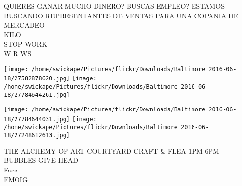 \documentclass[10pt,letterpaper]{article}
\begin{document}
QUIERES GANAR MUCHO DINERO?  BUSCAS EMPLEO?  ESTAMOS BUSCANDO REPRESENTANTES DE VENTAS PARA UNA COPANIA DE MERCADEO\\
KILO\\
STOP WORK\\
W R WS
\pagebreak

\texttt{[image: /home/swickape/Pictures/flickr/Downloads/Baltimore 2016-06-18/27582878620.jpg]}
\texttt{[image: /home/swickape/Pictures/flickr/Downloads/Baltimore 2016-06-18/27784644261.jpg]}

\texttt{[image: /home/swickape/Pictures/flickr/Downloads/Baltimore 2016-06-18/27784644031.jpg]}
\texttt{[image: /home/swickape/Pictures/flickr/Downloads/Baltimore 2016-06-18/27248612613.jpg]}

THE ALCHEMY OF ART COURTYARD CRAFT \& FLEA 1PM{-}6PM\\
BUBBLES GIVE HEAD\\
Face\\
FMOIG
\pagebreak
\end{document}
